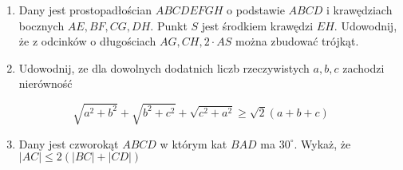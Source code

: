 \documentclass[10pt]{article}
\begin{document}
\begin{enumerate}
  \item Dany jest prostopadłościan \(A B C D E F G H\) o podstawie \(A B C D\) i krawędziach bocznych \(A E, B F, C G, D H\). Punkt \(S\) jest środkiem krawędzi \(E H\). Udowodnij, że z odcinków o długościach \(A G, C H, 2 \cdot A S\) można zbudować trójkąt.
  \item Udowodnij, ze dla dowolnych dodatnich liczb rzeczywistych \(a, b, c\) zachodzi nierówność
\end{enumerate}

\[
\sqrt{a^{2}+b^{2}}+\sqrt{b^{2}+c^{2}}+\sqrt{c^{2}+a^{2}} \geq \sqrt{2}(a+b+c)
\]

\begin{enumerate}
  \setcounter{enumi}{2}
  \item Dany jest czworokąt \(A B C D\) w którym kat \(B A D\) ma \(30^{\circ}\). Wykaż, że \(|A C| \leq 2(|B C|+|C D|)\)
\end{enumerate}
\end{document}
